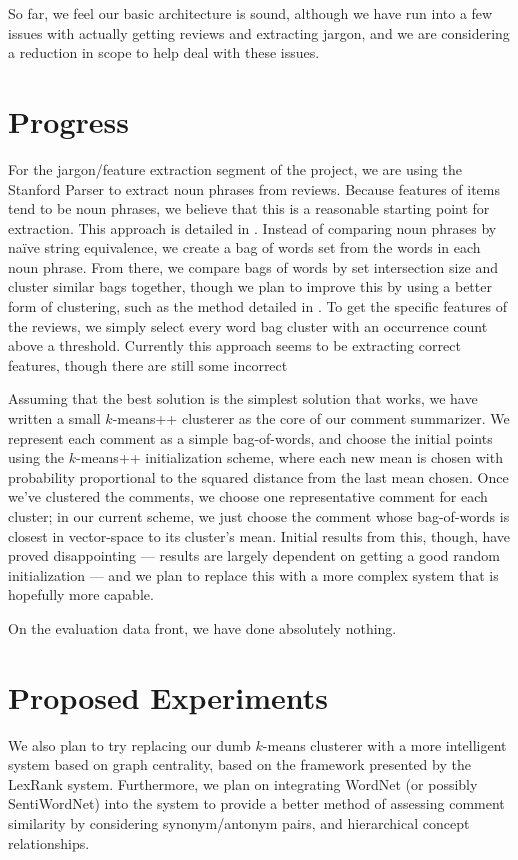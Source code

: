 \documentclass{article}
\begin{document}
So far, we feel our basic architecture is sound, although we have run into a
few issues with actually getting reviews and extracting jargon, and we are
considering a reduction in scope to help deal with these issues.

\section{Progress}
For the jargon/feature extraction segment of the project, we are using the Stanford Parser to extract noun phrases from reviews.  Because features of items tend to be noun phrases, we believe that this is a reasonable starting point for extraction.  This approach is detailed in \cite{opine}.  Instead of comparing noun phrases by na\" ive string equivalence, we create a bag of words set from the words in each noun phrase.  From there, we compare bags of words by set intersection size and cluster similar bags together, though we plan to improve this by using a better form of clustering, such as the method detailed in \cite{lexrank}.  To get the specific features of the reviews, we simply select every word bag cluster with an occurrence count above a threshold.  Currently this approach seems to be extracting correct features, though there are still some incorrect 


Assuming that the best solution is the simplest solution that works, we have
written a small $k$-means++ clusterer as the core of our comment summarizer. We
represent each comment as a simple bag-of-words, and choose the initial points
using the $k$-means++ initialization scheme, where each new mean is chosen
with probability proportional to the squared distance from the last mean
chosen. Once we've clustered the comments, we choose one representative comment
for each cluster; in our current scheme, we just choose the comment whose
bag-of-words is closest in vector-space to its cluster's mean.
Initial results from this, though, have proved disappointing --- results
are largely dependent on getting a good random initialization --- and
we plan to replace this with a more complex system that is hopefully more
capable.

On the evaluation data front, we have done absolutely nothing.

\section{Proposed Experiments}

We also plan to try replacing our dumb $k$-means clusterer with a more
intelligent system based on graph centrality, based on the framework presented
by the LexRank system. Furthermore, we plan on integrating WordNet (or possibly
SentiWordNet) into the system to provide a better method of assessing comment
similarity by considering synonym/antonym pairs, and hierarchical concept
relationships.

\tocsection


\end{document}
